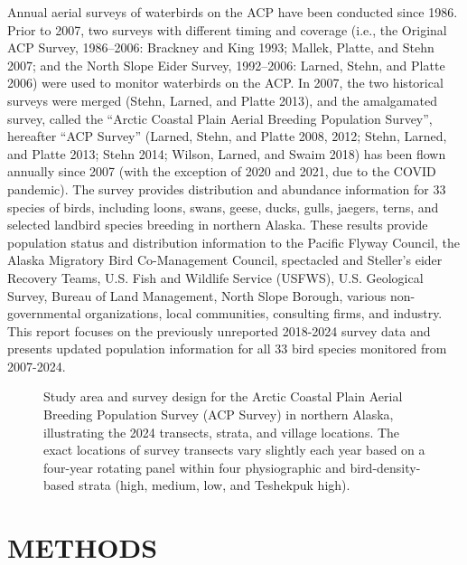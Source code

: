 \documentclass[
]{article}
\begin{document}
Annual aerial surveys of waterbirds on the ACP have been conducted since
1986. Prior to 2007, two surveys with different timing and coverage
(i.e., the Original ACP Survey, 1986--2006: Brackney and King 1993;
Mallek, Platte, and Stehn 2007; and the North Slope Eider Survey,
1992--2006: Larned, Stehn, and Platte 2006) were used to monitor
waterbirds on the ACP. In 2007, the two historical surveys were merged
(Stehn, Larned, and Platte 2013), and the amalgamated survey, called the
``Arctic Coastal Plain Aerial Breeding Population Survey'', hereafter
``ACP Survey'' (Larned, Stehn, and Platte 2008, 2012; Stehn, Larned, and
Platte 2013; Stehn 2014; Wilson, Larned, and Swaim 2018) has been flown
annually since 2007 (with the exception of 2020 and 2021, due to the
COVID pandemic). The survey provides distribution and abundance
information for 33 species of birds, including loons, swans, geese,
ducks, gulls, jaegers, terns, and selected landbird species breeding in
northern Alaska. These results provide population status and
distribution information to the Pacific Flyway Council, the Alaska
Migratory Bird Co-Management Council, spectacled and Steller's eider
Recovery Teams, U.S. Fish and Wildlife Service (USFWS), U.S. Geological
Survey, Bureau of Land Management, North Slope Borough, various
non-governmental organizations, local communities, consulting firms, and
industry. This report focuses on the previously unreported 2018-2024
survey data and presents updated population information for all 33 bird
species monitored from 2007-2024.

\begin{figure}


\caption{\label{fig-Fig1}Study area and survey design for the Arctic
Coastal Plain Aerial Breeding Population Survey (ACP Survey) in northern
Alaska, illustrating the 2024 transects, strata, and village locations.
The exact locations of survey transects vary slightly each year based on
a four-year rotating panel within four physiographic and
bird-density-based strata (high, medium, low, and Teshekpuk high).}

\end{figure}%

\section*{METHODS}\label{methods}
\end{document}
